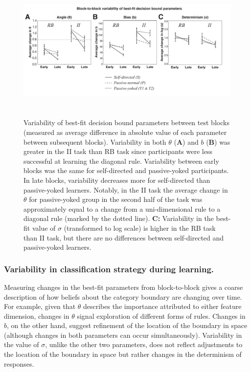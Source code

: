 \documentclass[3p,twocolumn,authoryear,10pt]{elsarticle}
\begin{document}
\begin{figure}[t]
\centerline{\includegraphics[height=2.8in]{figures/variability.pdf}}
\caption{Variability of best-fit decision bound parameters between test blocks (measured as average difference in absolute value of each parameter between subsequent blocks). Variability in both $\theta$ (\textbf{A}) and $b$ (\textbf{B}) was greater in the II task than RB task since participants were less successful at learning the diagonal rule. Variability between early blocks was the same for self-directed and passive-yoked participants. In late blocks, variability decreases more for self-directed than passive-yoked learners. Notably, in the II task the average change in $\theta$ for passive-yoked group in the second half of the task was approximately equal to a change from a uni-dimensional rule to a diagonal rule (marked by the dotted line). \textbf{C:} Variability in the best-fit value of $\sigma$ (transformed to log scale) is higher in the RB task than II task, but there are no differences between self-directed and passive-yoked learners.}
\label{variability.fig}
\end{figure}



\subsubsection{Variability in classification strategy during learning.} Measuring changes in the best-fit parameters from block-to-block gives a coarse description of how beliefs about the category boundary are changing over time. For example, given that $\theta$ describes the importance attributed to either feature dimension, changes in $\theta$ signal exploration of different forms of rules. Changes in $b$, on the other hand, suggest refinement of the location of the boundary in space (although changes in both parameters can occur simultaneously). Variability in the value of $\sigma$, unlike the other two parameters, does not reflect adjustments to the location of the boundary in space but rather changes in the determinism of responses. 
\end{document}
